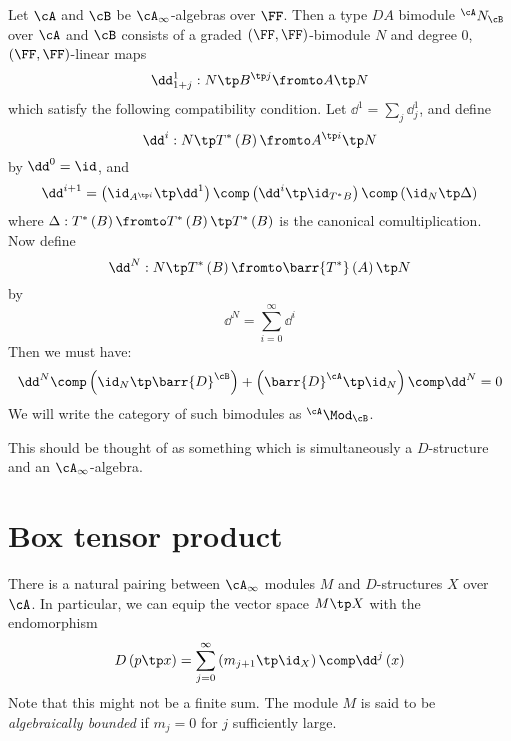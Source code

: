 \documentclass{amsproc}
\begin{document}
\begin{defn}
Let $\cA$ and $\cB$
be $\cA_\infty$-algebras over $\FF$.
Then a type $DA$ bimodule $^{\cA} N_\cB$ over $\cA$ and 
$\cB$ consists of a graded $\left( \FF, \FF \right)$-bimodule $N$
and degree $0$, $\left( \FF , \FF \right)$-linear maps
\begin{equation}
\dd_{1 + j}^1: N\tp B^{\tp j} \fromto A \tp N
\end{equation}
which satisfy the following compatibility condition.
Let $\dd^1 = \sum_j \dd^1_j$, and define
\begin{equation}
\dd^i:N\tp T^*\left( B \right) \fromto
A^{\tp i} \tp N
\end{equation}
by $\dd^0 = \id$, and 
\begin{equation}
\dd^{i+1} = \left( \id_{A^{\tp i}} \tp \dd^1 \right) \comp 
\left( \dd^i \tp \id_{T^* B} \right)\comp
\left( \id_N \tp \Delta \right)
\end{equation}
where $\Delta : T^*\left( B \right)\fromto T^*\left( B \right)\tp T^*\left( B \right)$
is the canonical comultiplication. 
Now define
\begin{equation}
\dd^N : N\tp T^*\left( B \right) \fromto \barr{T^*}\left( A \right)\tp N
\end{equation}
by 
\begin{equation}
\dd^N = \sum_{i = 0}^\infty \dd^i
\end{equation}
Then we must have:
\begin{equation}
\dd^N \comp \left( \id_N \tp \barr{D}^\cB\right) +
\left( \barr{D}^\cA \tp \id_N \right)\comp \dd^N = 0
\end{equation}
We will write the category of such bimodules as
$^{\cA}\Mod_\cB$.
\end{defn}

This should be thought of as something which is simultaneously a 
$D$-structure and an $\cA_\infty$-algebra.

\section{Box tensor product}


There is a natural pairing between $\cA_\infty$ modules $M$
and $D$-structures $X$ over $\cA$. In particular, we can
equip the vector space $M\tp X$ with the endomorphism
\begin{equation}
D\left( p\tp x \right) = 
\sum_{j = 0}^\infty
\left( m_{j+1} \tp \id_X \right)\comp \dd^j\left( x \right)
\end{equation}
Note that this might not be a finite sum. 
The module $M$ is said to be \emph{algebraically bounded} if
$m_j = 0$ for $j$ sufficiently large.
\end{document}
